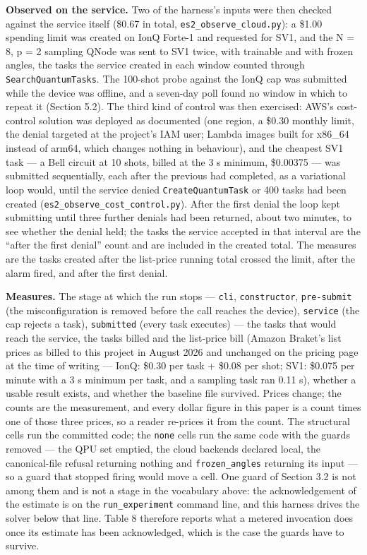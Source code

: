 \documentclass[acmsmall,screen,review]{acmart}
\begin{document}
\textbf{Observed on the service.} Two of the harness's inputs were then checked against the service itself (\$0.67 in total, \texttt{es2\_\allowbreak{}observe\_\allowbreak{}cloud.\allowbreak{}py}): a \$1.00 spending limit was created on IonQ Forte-1 and requested for SV1, and the N = 8, p = 2 sampling QNode was sent to SV1 twice, with trainable and with frozen angles, the tasks the service created in each window counted through \texttt{Search\allowbreak{}Quantum\allowbreak{}Tasks}. The 100-shot probe against the IonQ cap was submitted while the device was offline, and a seven-day poll found no window in which to repeat it (Section 5.2). The third kind of control was then exercised: AWS's cost-control solution \cite{ref33} was deployed as documented (one region, a \$0.30 monthly limit, the denial targeted at the project's IAM user; Lambda images built for x86\_64 instead of arm64, which changes nothing in behaviour), and the cheapest SV1 task --- a Bell circuit at 10 shots, billed at the 3 s minimum, \$0.00375 --- was submitted sequentially, each after the previous had completed, as a variational loop would, until the service denied \texttt{CreateQuantumTask} or 400 tasks had been created (\texttt{es2\_\allowbreak{}observe\_\allowbreak{}cost\_\allowbreak{}control.\allowbreak{}py}). After the first denial the loop kept submitting until three further denials had been returned, about two minutes, to see whether the denial held; the tasks the service accepted in that interval are the ``after the first denial'' count and are included in the created total. The measures are the tasks created after the list-price running total crossed the limit, after the alarm fired, and after the first denial.


\textbf{Measures.} The stage at which the run stops --- \texttt{cli}, \texttt{constructor}, \texttt{pre-submit} (the misconfiguration is removed before the call reaches the device), \texttt{service} (the cap rejects a task), \texttt{submitted} (every task executes) --- the tasks that would reach the service, the tasks billed and the list-price bill (Amazon Braket's list prices as billed to this project in August 2026 and unchanged on the pricing page at the time of writing \cite{ref43} --- IonQ: \$0.30 per task + \$0.08 per shot; SV1: \$0.075 per minute with a 3 s minimum per task, and a sampling task ran 0.11 s), whether a usable result exists, and whether the baseline file survived. Prices change; the counts are the measurement, and every dollar figure in this paper is a count times one of those three prices, so a reader re-prices it from the count. The structural cells run the committed code; the \texttt{none} cells run the same code with the guards removed --- the QPU set emptied, the cloud backends declared local, the canonical-file refusal returning nothing and \texttt{frozen\_angles} returning its input --- so a guard that stopped firing would move a cell. One guard of Section 3.2 is not among them and is not a stage in the vocabulary above: the acknowledgement of the estimate is on the \texttt{run\_experiment} command line, and this harness drives the solver below that line. Table 8 therefore reports what a metered invocation does once its estimate has been acknowledged, which is the case the guards have to survive.
\end{document}
